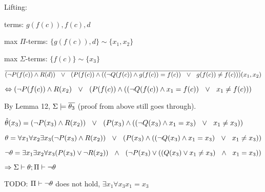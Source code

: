 \documentclass[,%
			paper=a4,%
			landscape,
			DIV18,
			liststotoc,
			bibtotoc,
			draft=false,%
			numbers=noendperiod
			]{scrartcl}
\theoremstyle{definition}
\begin{document}
Lifting:
\medskip

terms: $g(f(c)), f(c), d$

max $\Pi$-terms: $\{g(f(c)), d\} \sim \{x_1, x_2\}$

max $\Sigma$-terms: $\{f(c)\} \sim \{x_3\}$
\medskip

$\overline{(\lnot P(f(c)) \land R(d)) \ \ \lor \ \  ( P(f(c)) \land ((\lnot Q(f(c)) \land g(f(c)) = f(c)) \ \ \lor \ \  g(f(c)) \neq f(c) ))}(x_1, x_2)$

$ \Leftrightarrow (\lnot P(f(c)) \land R(x_2) \ \ \lor \ \  ( P(f(c)) \land ((\lnot Q(f(c)) \land x_1 = f(c)) \ \ \lor \ \  x_1 \neq f(c) ))$
\medskip

By Lemma 12, $\Sigma \models \overline{\theta_3}$ (proof from above still goes through).


$\hat{\theta}(x_3) =
(\lnot P(x_3) \land R(x_2)) \ \ \lor \ \  ( P(x_3) \land ((\lnot Q(x_3) \land x_1 = x_3) \ \ \lor \ \  x_1 \neq x_3 ) )$

$\theta = \forall x_1 \forall x_2 \exists x_3 (\lnot P(x_3) \land R(x_2)) \ \ \lor \ \  ( P(x_3) \land ((\lnot Q(x_3) \land x_1 = x_3) \ \ \lor \ \  x_1 \neq x_3 ) ) $

$\lnot \theta = 
\exists x_1 \exists x_2 \forall x_3 (P(x_3) \lor \lnot R(x_2)) \ \ \land \ \  ( \lnot P(x_3) \lor ((Q(x_3) \lor x_1 \neq x_3) \ \ \land \ \  x_1 = x_3 )) $


$\Rightarrow \Sigma \vdash \theta; \Pi \vdash \lnot \theta$


TODO: $\Pi \vdash \lnot \theta$ does not hold, $\exists x_1 \forall x_3 x_1 = x_3$
\end{document}
